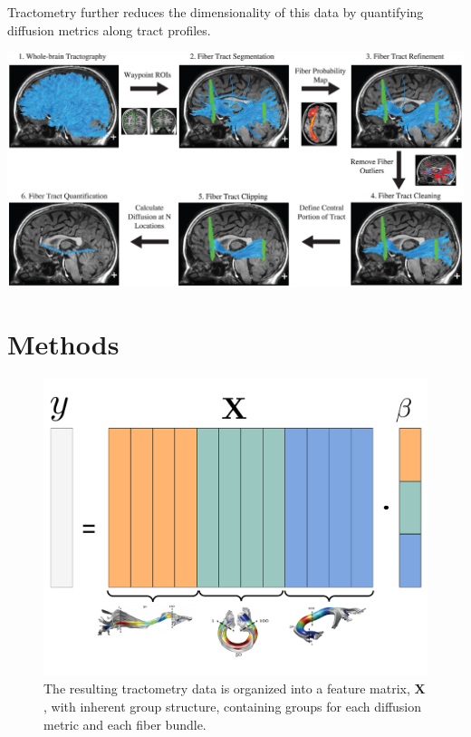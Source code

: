 \documentclass[a0, landscape]{a0poster}
\newenvironment{Figure}
  {\par\medskip\noindent\minipage{\linewidth}}
  {\endminipage\par\medskip}
\begin{document}
\begin{multicols}{3}
\noindent Tractometry further reduces the dimensionality of this data by quantifying diffusion metrics along tract profiles.

\begin{Figure}
    \centering
    \includegraphics[width=0.9\linewidth]{afq_pipeline.png}
\end{Figure}


\vspace{-1.25em}
\section*{Methods}

\begin{figure}
    \centering
    \vspace{-1em}
    \includegraphics[width=0.9\linewidth]{group_structure.pdf}
    \vspace{-1em}
    \caption{The resulting tractometry data is organized into a feature matrix, $\mathbf{X}$, with inherent group structure, containing groups for each diffusion metric and each fiber bundle.}
    \vspace{-1em}
\end{figure}


\end{multicols}
\end{document}
